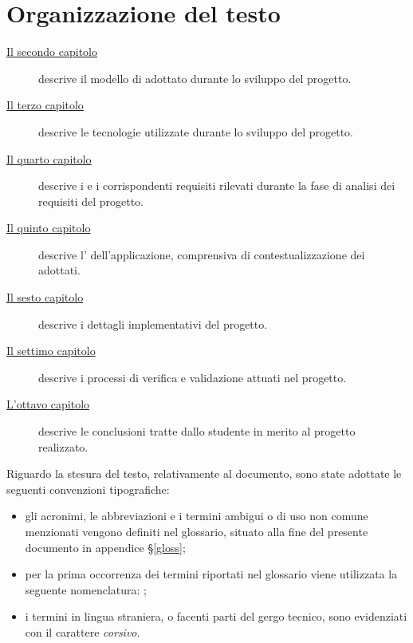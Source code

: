 \section{Organizzazione del testo}

\begin{description}
    \item[{\hyperref[cap:processi-metodologie]{Il secondo capitolo}}] descrive il modello di  adottato durante lo sviluppo del progetto.
    
    \item[{\hyperref[background]{Il terzo capitolo}}] descrive le tecnologie utilizzate durante lo sviluppo del progetto.
    
    \item[{\hyperref[cap:analisi-requisiti]{Il quarto capitolo}}] descrive i  e i corrispondenti requisiti rilevati durante la fase di analisi dei requisiti del progetto.
    
    \item[{\hyperref[cap:progettazione-codifica]{Il quinto capitolo}}] descrive l' dell'applicazione, comprensiva di contestualizzazione dei  adottati.
    
    \item[{\hyperref[codifica]{Il sesto capitolo}}] descrive i dettagli implementativi del progetto.
    
    \item[{\hyperref[cap:verifica-validazione]{Il settimo capitolo}}] descrive i processi di verifica e validazione attuati nel progetto.
    
    \item[{\hyperref[cap:conclusioni]{L'ottavo capitolo}}] descrive le conclusioni tratte dallo studente in merito al progetto realizzato.
\end{description}

Riguardo la stesura del testo, relativamente al documento, sono state adottate le seguenti convenzioni tipografiche:
\begin{itemize}
	\item gli acronimi, le abbreviazioni e i termini ambigui o di uso non comune menzionati vengono definiti nel glossario, situato alla fine del presente documento in appendice §\ref{gloss};
	\item per la prima occorrenza dei termini riportati nel glossario viene utilizzata la seguente nomenclatura: ;
	\item i termini in lingua straniera, o facenti parti del gergo tecnico, sono evidenziati con il carattere \emph{corsivo}.
\end{itemize}